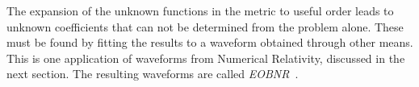 The expansion of the unknown functions in the metric to useful order
leads to unknown coefficients that can not be determined from the
problem alone.  These must be found by fitting the results to a
waveform obtained through other means.  This is one application of
waveforms from Numerical Relativity, discussed in the next section.
The resulting waveforms are called
\emph{EOBNR}~\cite{Buonanno:2009qa}.
% 
% 
% 
% 
% 
